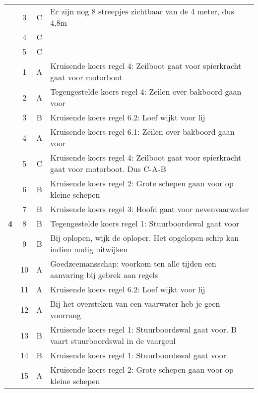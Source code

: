 \begin{table}[h!]
\begin{tabular}{c|c|c|m{9.5cm}}
		& 3 & C &  Er zijn nog 8 streepjes zichtbaar van de 4 meter, dus 4,8m\\ \cline{2-4} 
		& 4 & C &  \\ \cline{2-4}
		& 5 & C &  \\ \cline{2-4} \hline
		\multirow{20}{*}{\sffamily\bfseries{\textcolor{ocre}{\LARGE4}} } 
		& 1 & A & Kruisende koers regel 4: Zeilboot gaat voor spierkracht gaat voor motorboot\\ \cline{2-4} 
		& 2 & A & Tegengestelde koers regel 4: Zeilen over bakboord gaan voor \\ \cline{2-4} 
		& 3 & B & Kruisende koers regel 6.2: Loef wijkt voor lij \\ \cline{2-4} 
		& 4 & A & Kruisende koers regel 6.1: Zeilen over bakboord gaan voor \\ \cline{2-4} 
		& 5 & C & Kruisende koers regel 4: Zeilboot gaat voor spierkracht gaat voor motorboot. Dus C-A-B \\ \cline{2-4} 
		& 6 & B & Kruisende koers regel 2: Grote schepen gaan voor op kleine schepen \\ \cline{2-4} 
		& 7 & B & Kruisende koers regel 3: Hoofd gaat voor nevenvaarwater \\ \cline{2-4} 
		& 8 & B & Tegengestelde koers regel 1: Stuurboordswal gaat voor \\ \cline{2-4} 
		& 9 & B & Bij oplopen, wijk de oploper. Het opgelopen schip kan indien nodig uitwijken\\ \cline{2-4} 
		& 10 & A & Goedzeemansschap: voorkom ten alle tijden een aanvaring bij gebrek aan regels \\ \cline{2-4} 
		& 11 & A & Kruisende koers regel 6.2: Loef wijkt voor lij \\ \cline{2-4} 
		& 12 & A & Bij het oversteken van een vaarwater heb je geen voorrang \\ \cline{2-4} 
		& 13 & B & Kruisende koers regel 1: Stuurboordswal gaat voor. B vaart stuurboordswal in de vaargeul\\ \cline{2-4} 
		& 14 & B & Kruisende koers regel 1: Stuurboordswal gaat voor \\ \cline{2-4} 
   		& 15 & A & Kruisende koers regel 2: Grote schepen gaan voor op kleine schepen \\ 
	\end{tabular}
\end{table}

